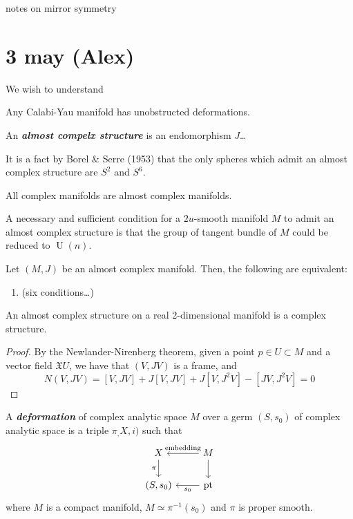 \documentclass{article}
\numberwithin{equation}{section}
\newcommand{\Xf}{\mathfrak{X}}
\DeclareMathOperator{\pt}{pt}
\DeclareMathOperator{\U}{U}
\begin{document}
{\LARGE notes on mirror symmetry}
\section{3 may (Alex)}

We wish to understand
\begin{thm}
	Any Calabi-Yau manifold has unobstructed deformations.
\end{thm}

\begin{defn}
	An \textbf{\textit{almost compelx structure}} is an endomorphism $J$…
 \end{defn}
 \begin{remark}
 	It is a fact by Borel \& Serre (1953) that the only spheres which admit an almost complex structure are $S^2$ and $S^6$.
 \end{remark}
\begin{example}
	All complex manifolds are almost complex manifolds.
\end{example}
\begin{thm}
	A necessary and sufficient condition for a $2u$-smooth manifold $M$ to admit an almost complex structure is that the group of tangent bundle of $M$ could be reduced to $\U(n)$.
\end{thm}
\begin{thm}
	Let $(M,J)$ be an almost complex manifold. Then, the following are equivalent:
	\begin{enumerate}
		\item (six conditions…)
	\end{enumerate}
\end{thm}
\begin{prop}
	An almost complex structure on a real 2-dimensional manifold is a complex structure.
\end{prop}
\begin{proof}
	By the Newlander-Nirenberg theorem, given a point $p\in U\subset M$ and a vector field $\Xf{U}$, we have that $(V,JV)$ is a frame, and
	\[N(V,JV)=[V,JV]+J[V,JV]+J[V,J^2V]-[JV,J^2V]=0\]
\end{proof}
\begin{defn}
	A \textbf{\textit{deformation}} of complex analytic space $M$ over a germ $(S,s_0)$ of complex analytic space is a triple $\pi_,X,i)$ such that
	\[\begin{tikzcd}
		X\arrow[d,"\pi",swap]&M\arrow[l,"\text{embedding}",swap]\arrow[d]\\
		(S,s_0)&\pt\arrow[l,"s_0"]
	\end{tikzcd}\]
	where $M$ is a compact manifold, $M\simeq\pi^{-1}(s_0)$ and $\pi$ is proper smooth.
\end{defn}
\end{document}
